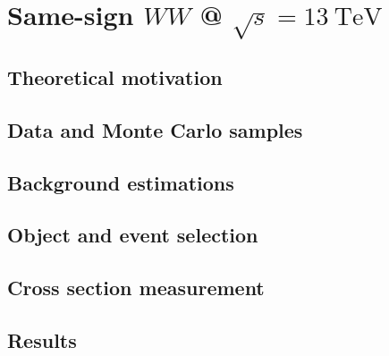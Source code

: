 \chapter[Same-sign $WW$ @ $\sqrt{s} = 13~\mathrm{TeV}$][Same-sign $WW$ @ $\sqrt{s} = 13~\mathrm{TeV}$]{Same-sign $WW$ @ $\sqrt{s} = 13~\mathrm{TeV}$}
\label{ch:ssww13tev}



\section{Theoretical motivation}\label{ssww13tev:theory}


\section{Data and Monte Carlo samples}\label{ssww13tev:data_mc}


%

\section{Background estimations}\label{ssww13tev:background}


\section{Object and event selection}\label{ssww13tev:object_event_selection}


\section{Cross section measurement}\label{ssww13tev:xsec}


\section{Results}\label{ssww13tev:results}


